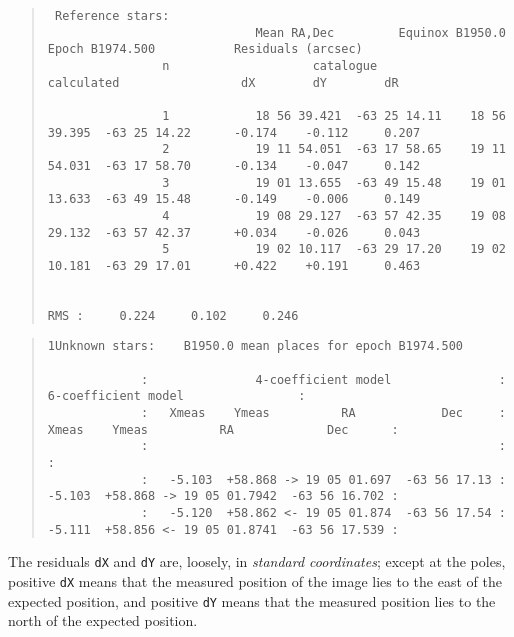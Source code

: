 \documentclass[twoside,11pt]{article}
\renewcommand{\_}{\texttt{\symbol{95}}}
\begin{document}
\begin{tiny}
\begin{quote}
\begin{verbatim}
 Reference stars:
                             Mean RA,Dec         Equinox B1950.0      Epoch B1974.500           Residuals (arcsec)
                n                    catalogue                     calculated                 dX        dY        dR

                1            18 56 39.421  -63 25 14.11    18 56 39.395  -63 25 14.22      -0.174    -0.112     0.207
                2            19 11 54.051  -63 17 58.65    19 11 54.031  -63 17 58.70      -0.134    -0.047     0.142
                3            19 01 13.655  -63 49 15.48    19 01 13.633  -63 49 15.48      -0.149    -0.006     0.149
                4            19 08 29.127  -63 57 42.35    19 08 29.132  -63 57 42.37      +0.034    -0.026     0.043
                5            19 02 10.117  -63 29 17.20    19 02 10.181  -63 29 17.01      +0.422    +0.191     0.463

                                                                                  RMS :     0.224     0.102     0.246
\end{verbatim}
\end{quote}

\vspace*{20mm}

\begin{quote}
\begin{verbatim}
1Unknown stars:    B1950.0 mean places for epoch B1974.500

             :               4-coefficient model               :                6-coefficient model                :
             :   Xmeas    Ymeas          RA            Dec     :   Xmeas    Ymeas          RA             Dec      :     
             :                                                 :                                                   :
             :   -5.103  +58.868 -> 19 05 01.697  -63 56 17.13 :   -5.103  +58.868 -> 19 05 01.7942  -63 56 16.702 :     
             :   -5.120  +58.862 <- 19 05 01.874  -63 56 17.54 :   -5.111  +58.856 <- 19 05 01.8741  -63 56 17.539 :     
\end{verbatim}
\end{quote}
\end{tiny}

\vspace*{20mm}


The residuals \texttt{dX} and \texttt{dY} are, loosely, in
\textit{standard coordinates}; except at the poles, positive
\texttt{dX} means that the measured position of the image lies to the
east of the expected position, and positive \texttt{dY} means that the
measured position lies to the north of the expected position.
\end{document}
